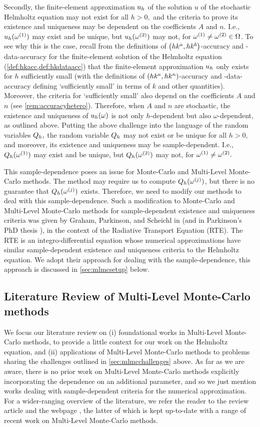 Secondly, the finite-element approximation $u_{h}$ of the solution $u$ of the stochastic Helmholtz equation may not exist for all $h > 0,$ and the criteria to prove its existence and uniqueness may be dependent on the coefficients $A$ and $n.$ I.e., $u_{h}(\omega^{(1)})$ may exist and be unique, but $u_{h}(\omega^{(2)})$ may not, for $\omega^{(1)}\neq\omega^{(2)}\in\Omega$. To see why this is the case, recall from the definitions of $\hk{a}{b}$-accuracy and -data-accuracy for the finite-element solution of the Helmholtz equation (\cref{def:hkacc,def:hkdataacc}) that the finite-element approximation $u_{h}$ only exists for $h$ sufficiently small (with the definitions of $\hk{a}{n}$-accuracy and -data-accuracy defining `sufficiently small' in terms of $k$ and other quantities). Moreover, the criteria for `sufficiently small' also depend on the coefficients $A$ and $n$ (see \cref{rem:accuracyhetero}). Therefore, when $A$ and $n$ are stochastic, the existence and uniqueness of $u_{h}(\omega)$ is not only $h$-dependent but also $\omega$-dependent, as outlined above. Putting the above challenge into the language of the random variables $Q_{h},$ the random variable $Q_{h}$ may not exist or be unique for all $h>0,$ and moreover, its existence and uniqueness may be sample-dependent. I.e., $Q_{h}(\omega^{(1)})$ may exist and be unique, but $Q_{h}(\omega^{(2)})$ may not, for $\omega^{(1)}\neq\omega^{(2)}.$

This sample-dependence poses an issue for Monte-Carlo and Multi-Level Monte-Carlo methods. The method may require us to compute $Q_{h}(\omega^{(j)})$, but there is no guarantee that $Q_{h}(\omega^{(j)})$ exists. Therefore, we need to modify our methods to deal with this sample-dependence. Such a modification to Monte-Carlo and Multi-Level Monte-Carlo methods for sample-dependent existence and uniqueness criteria was given by Graham, Parkinson, and Scheichl in \cite{GrPaSc:19} (and in Parkinson's PhD thesis \cite{Pa:18}), in the context of the Radiative Transport Equation (RTE). The RTE is an integro-differential equation whose numerical approximations have similar sample-dependent existence and uniqueness criteria to the Helmholtz equation. We adopt their approach for dealing with the sample-dependence, this approach is discussed in \cref{sec:mlmcsetup} below.

\subsection{Literature Review of Multi-Level Monte-Carlo methods}
We focus our literature review on (i) foundational works in Multi-Level Monte-Carlo methods, to provide a little context for our work on the Helmholtz equation, and (ii) applications of Multi-Level Monte-Carlo methods to problems sharing the challenges outlined in \cref{sec:mlmcchallenges} above. As far as we are aware, there is no prior work on Multi-Level Monte-Carlo methods explicitly incorporating the dependence on an additional parameter, and so we just mention works dealing with sample-dependent criteria for the numerical approximation. For a wider-ranging overview of the literature, we refer the reader to the review article \cite{Gi:15} and the webpage \cite{Gi}, the latter of which is kept up-to-date with a range of recent work on Multi-Level Monte-Carlo methods.

